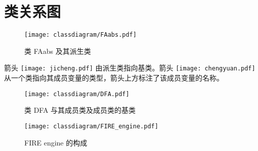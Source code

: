\chapter{类关系图}

\begin{figure}[!htbp]
    \centering
        \texttt{[image: classdiagram/FAabs.pdf]}
    \caption{类 FAabs 及其派生类}
    \label{fig:class-faabs}
\end{figure}

箭头 \texttt{[image: jicheng.pdf]} 由派生类指向基类。箭头 \texttt{[image: chengyuan.pdf]} 从一个类指向其成员变量的类型，箭头上方标注了该成员变量的名称。







\begin{figure}[!htbp]
    \centering
        \texttt{[image: classdiagram/DFA.pdf]}
    \caption{类 DFA 与其成员类及成员类的基类}
    \label{fig:class-dfa}
\end{figure}

\begin{figure}[!htbp]
    \centering
        \texttt{[image: classdiagram/FIRE\_engine.pdf]}
    \caption{FIRE engine 的构成}
    \label{fig:FIRE-engine}
\end{figure}